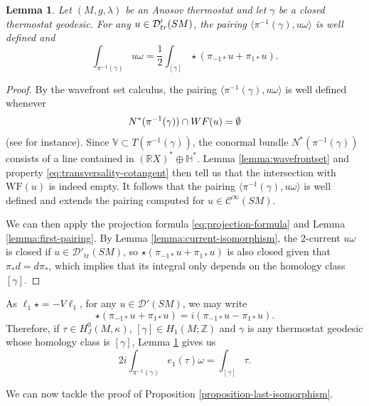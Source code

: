\documentclass[reqno,12pt,letterpaper]{amsart}
\newtheorem{lemma}[proposition]{Lemma}
\theoremstyle{definition}
\theoremstyle{remark}
\theoremstyle{definition}
\numberwithin{equation}{section}
\newcommand{\R}{\mathbb{R}}
\newcommand{\Z}{\mathbb{Z}}
\begin{document}
\begin{lemma}\label{lemma:pairing-two}
Let $(M, g, \lambda)$ be an Anosov thermostat and let $\gamma$ be a closed thermostat geodesic. For any $u\in \mathcal{D}'_{\textup{tr}}(SM)$, the pairing $\langle \pi^{-1}(\gamma), u\omega\rangle$ is well defined and
\begin{equation*}
\int_{\pi^{-1}(\gamma)} u \omega =\dfrac{1}{2} \int_{[\gamma]} \star(\pi_{-1\ast}u+\pi_{1\ast}u).
\end{equation*}
\end{lemma}
\begin{proof}
By the wavefront set calculus, the pairing $\langle \pi^{-1}(\gamma), u\omega\rangle$ is well defined whenever
\begin{equation}\label{eq:wavefrontset-condition}
N^*(\pi^{-1}(\gamma))\cap \textup{WF}(u)=\emptyset
\end{equation}
(see \cite[Corollary 8.2.7]{hormander03}  for instance). Since $\mathbb{V}\subset T(\pi^{-1}(\gamma))$, the conormal bundle $N^*(\pi^{-1}(\gamma))$ consists of a line contained in $(\R X)^*\oplus \mathbb{H}^*$. Lemma \ref{lemma:wavefrontset} and property \eqref{eq:transversality-cotangent} then tell us that the intersection with $\text{WF}(u)$ is indeed empty. It follows that the pairing $\langle \pi^{-1}(\gamma), u\omega\rangle$ is well defined and extends the pairing computed for $u\in \mathcal{C}^\infty(SM)$. 

We can then apply the projection formula \eqref{eq:projection-formula} and Lemma \ref{lemma:first-pairing}. By Lemma \ref{lemma:current-isomorphism}, the $2$-current $u\omega$ is closed if $u\in \mathcal{D}'_{\text{tr}}(SM)$, so $\star(\pi_{-1\ast}u+\pi_{1\ast}u)$ is also closed given that $\pi_* d = d\pi_*$, which implies that its integral only depends on the homology class $[\gamma]$. 
\end{proof}

As $\ell_1\star = -V\ell_1$, for any $u\in \mathcal{D}'(SM)$, we may write 
$$\star\left(\pi_{-1\ast}u+\pi_{1\ast}u\right)=i\left(\pi_{-1\ast}u-\pi_{1\ast}u\right).$$
Therefore, if $\tau \in H^0_J(M, \kappa)$, $[\gamma]\in H_1(M; \Z)$ and $\gamma$ is any thermostat geodesic whose homology class is $[\gamma]$, Lemma \ref{lemma:pairing-two} gives us
\begin{equation}\label{eq:translated-to-i}
2i\int_{\pi^{-1}(\gamma)} e_1(\tau)\omega=  \int_{[\gamma]}\tau.
\end{equation}

We can now tackle the proof of Proposition \ref{proposition-last-isomorphism}. 
\end{document}
